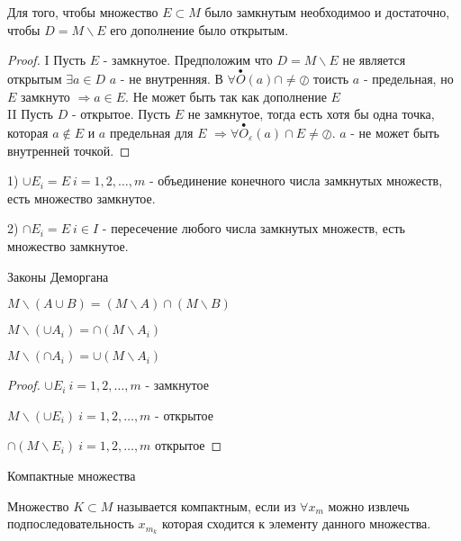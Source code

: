 \begin{theorem}
  Для того, чтобы множество $E \subset M$ было замкнутым необходимоо и
  достаточно, чтобы $D = M\backslash E$ его дополнение было открытым.
\end{theorem}

\begin{proof}
  I Пусть $E$ - замкнутое. Предположим что $D = M \backslash E$ не является
  открытым $\exists a \in D$ $a$ - не внутренняя. В $\forall
  \stackrel{\bullet}{O}(a) \cap \not= \oslash$ тоисть $a$ - предельная, но $E$
  замкнуто $\Rightarrow a \in E$. Не может быть так как дополнение $E$\\

  II Пусть $D$ - открытое. Пусть $E$ не замкнутое, тогда есть хотя бы одна
  точка, которая $a \not\in E$ и $a$ предельная для $E$ $\Rightarrow \forall
  \stackrel{\bullet}{O}_{\varepsilon}(a) \cap E \not= \oslash$. $a$ - не может
  быть внутренней точкой.
\end{proof}

\begin{block}[Свойства]
  1) $\cup E_i = E ~ i = 1,2, \ldots, m$ - объединение конечного числа
  замкнутых множеств, есть множество замкнутое.

  2) $\cap E_i = E ~ i \in I$ - пересечение любого числа замкнутых множеств,
  есть множество замкнутое.

  Законы Деморгана

  $M \backslash (A \cup B) = (M \backslash A) \cap (M \backslash B)$

  $M \backslash (\cup A_i) = \cap (M \backslash A_i)$

  $M \backslash (\cap A_i) = \cup (M \backslash A_i)$

  \begin{proof}
    $\cup E_i ~ i = 1,2, \ldots, m$ - замкнутое

    $M \backslash (\cup E_i) ~ i = 1,2, \ldots, m$ - открытое

    $\cap (M \backslash E_i) ~ i = 1,2, \ldots, m$ открытое
  \end{proof}
\end{block}

\begin{title}[\Large]
  Компактные множества
\end{title}

\begin{define}
  Множество $K \subset M$ называется компактным, если из $\forall x_m$ можно
  извлечь подпоследовательность $x_{m_k}$ которая сходится к элементу данного
  множества.
\end{define}

